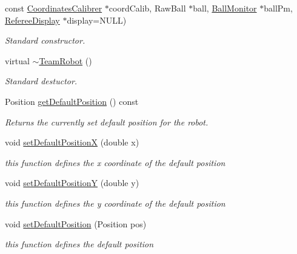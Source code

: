 \begin{DoxyCompactItemize}
const \hyperlink{classCoordinatesCalibrer}{CoordinatesCalibrer} $\ast$coordCalib, RawBall $\ast$ball, \hyperlink{classBallMonitor}{BallMonitor} $\ast$ballPm, \hyperlink{classRefereeDisplay}{RefereeDisplay} $\ast$display=NULL)
\begin{DoxyCompactList}\small\item\em Standard constructor. \item\end{DoxyCompactList}\item 
virtual \hyperlink{classTeamRobot_a7be9d5161b7524cbbb6ae486ad4a1b42}{$\sim$TeamRobot} ()
\begin{DoxyCompactList}\small\item\em Standard destuctor. \item\end{DoxyCompactList}\item 
Position \hyperlink{classTeamRobot_acd11ff6d9651a8deddafa5bd9a30865c}{getDefaultPosition} () const 
\begin{DoxyCompactList}\small\item\em Returns the currently set default position for the robot. \item\end{DoxyCompactList}\item 
void \hyperlink{classTeamRobot_a527cefdb32f2bc0a4fa770207d4dc934}{setDefaultPositionX} (double x)
\begin{DoxyCompactList}\small\item\em this function defines the x coordinate of the default position \item\end{DoxyCompactList}\item 
void \hyperlink{classTeamRobot_afeb86cb88b18030049d525d1d6790e6e}{setDefaultPositionY} (double y)
\begin{DoxyCompactList}\small\item\em this function defines the y coordinate of the default position \item\end{DoxyCompactList}\item 
void \hyperlink{classTeamRobot_a322f046e260aedff6f2c8edc5730c9ac}{setDefaultPosition} (Position pos)
\begin{DoxyCompactList}\small\item\em this function defines the default position \item\end{DoxyCompactList}\item 

\end{DoxyCompactItemize}
